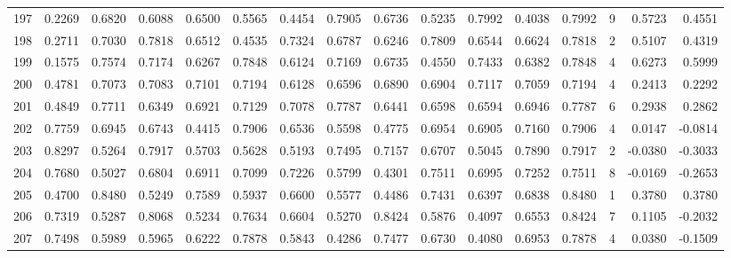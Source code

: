 \begin{tabular}{lrrrrrrrrrrrrrrr}
197 &      0.2269 &  0.6820 &  0.6088 &  0.6500 &  0.5565 &  0.4454 &  0.7905 &  0.6736 &  0.5235 &  0.7992 &   0.4038 &     0.7992 &      9 &                    0.5723 &                     0.4551 \\
198 &      0.2711 &  0.7030 &  0.7818 &  0.6512 &  0.4535 &  0.7324 &  0.6787 &  0.6246 &  0.7809 &  0.6544 &   0.6624 &     0.7818 &      2 &                    0.5107 &                     0.4319 \\
199 &      0.1575 &  0.7574 &  0.7174 &  0.6267 &  0.7848 &  0.6124 &  0.7169 &  0.6735 &  0.4550 &  0.7433 &   0.6382 &     0.7848 &      4 &                    0.6273 &                     0.5999 \\
200 &      0.4781 &  0.7073 &  0.7083 &  0.7101 &  0.7194 &  0.6128 &  0.6596 &  0.6890 &  0.6904 &  0.7117 &   0.7059 &     0.7194 &      4 &                    0.2413 &                     0.2292 \\
201 &      0.4849 &  0.7711 &  0.6349 &  0.6921 &  0.7129 &  0.7078 &  0.7787 &  0.6441 &  0.6598 &  0.6594 &   0.6946 &     0.7787 &      6 &                    0.2938 &                     0.2862 \\
202 &      0.7759 &  0.6945 &  0.6743 &  0.4415 &  0.7906 &  0.6536 &  0.5598 &  0.4775 &  0.6954 &  0.6905 &   0.7160 &     0.7906 &      4 &                    0.0147 &                    -0.0814 \\
203 &      0.8297 &  0.5264 &  0.7917 &  0.5703 &  0.5628 &  0.5193 &  0.7495 &  0.7157 &  0.6707 &  0.5045 &   0.7890 &     0.7917 &      2 &                   -0.0380 &                    -0.3033 \\
204 &      0.7680 &  0.5027 &  0.6804 &  0.6911 &  0.7099 &  0.7226 &  0.5799 &  0.4301 &  0.7511 &  0.6995 &   0.7252 &     0.7511 &      8 &                   -0.0169 &                    -0.2653 \\
205 &      0.4700 &  0.8480 &  0.5249 &  0.7589 &  0.5937 &  0.6600 &  0.5577 &  0.4486 &  0.7431 &  0.6397 &   0.6838 &     0.8480 &      1 &                    0.3780 &                     0.3780 \\
206 &      0.7319 &  0.5287 &  0.8068 &  0.5234 &  0.7634 &  0.6604 &  0.5270 &  0.8424 &  0.5876 &  0.4097 &   0.6553 &     0.8424 &      7 &                    0.1105 &                    -0.2032 \\
207 &      0.7498 &  0.5989 &  0.5965 &  0.6222 &  0.7878 &  0.5843 &  0.4286 &  0.7477 &  0.6730 &  0.4080 &   0.6953 &     0.7878 &      4 &                    0.0380 &                    -0.1509 \\

\end{tabular}
